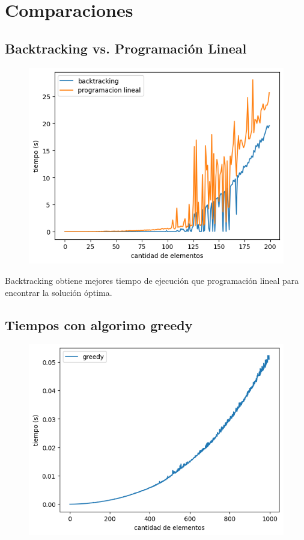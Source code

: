 \section{Comparaciones}

\subsection{Backtracking vs. Programación Lineal}

\begin{figure}[H]
    \centering
    \includegraphics[width=1\textwidth]{img/backvslp.png}
\end{figure}

Backtracking obtiene mejores tiempo de ejecución que programación lineal para
encontrar la solución óptima.

\subsection{Tiempos con algorimo greedy}

\begin{figure}[H]
    \centering
    \includegraphics[width=1\textwidth]{img/greedy.png}
\end{figure}

